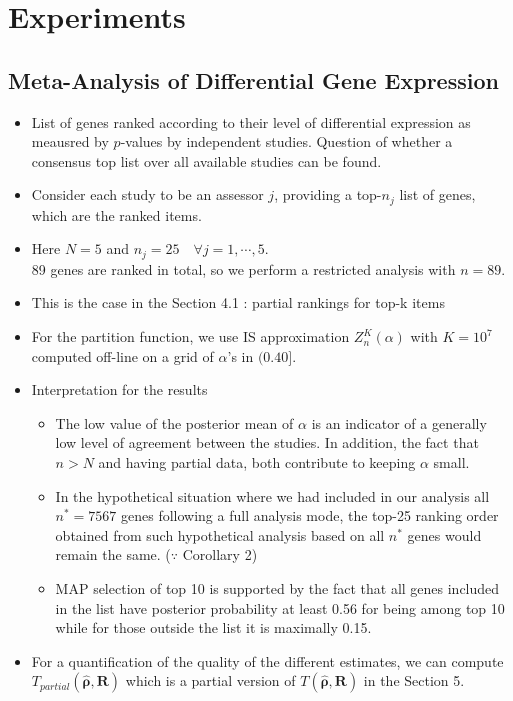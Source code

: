 \documentclass[12pt]{article}
\begin{document}
\section{Experiments}
\subsection{Meta-Analysis of Differential Gene Expression}
\begin{itemize}
    \item List of genes ranked according to their level of differential expression as meausred by $p$-values by independent studies. Question of whether a consensus top list over all available studies can be found.
    \item Consider each study to be an assessor $j$, providing a top-$n_j$ list of genes, which are the ranked items.
    \item Here $N=5$ and $n_j=25 \quad \forall j=1, \cdots ,5$. \\89 genes are ranked in total, so we perform a restricted analysis with $n=89$.
    \item This is the case in the Section 4.1 : partial rankings for top-k items
    \item For the partition function, we use IS approximation $Z_n^K(\alpha)$ with $K=10^7$ computed off-line on a grid of $\alpha$'s in $(0.40]$.
    \item Interpretation for the results
    \begin{itemize}
        \item The low value of the posterior mean of $\alpha$ is an indicator of a generally low level of agreement between the studies. In addition, the fact that $n>N$ and having partial data, both contribute to keeping $\alpha$ small. 
        \item In the hypothetical situation where we had included in our analysis all $n^*=7567$ genes following a full analysis mode, the top-25 ranking order obtained from such hypothetical analysis based on all $n^*$ genes would remain the same. ($\because$ Corollary 2)
        \item MAP selection of top 10 is supported by the fact that all genes included in the list have posterior probability at least 0.56 for being among top 10 while for those outside the list it is maximally 0.15. 
    \end{itemize}
    \item For a quantification of the quality of the different estimates, we can compute $T_{partial}(\hat{\boldsymbol{\rho}}, \mathbf{R})$ which is a partial version of $T(\hat{\boldsymbol{\rho}}, \mathbf{R})$ in the Section 5.
\end{itemize}
\end{document}
